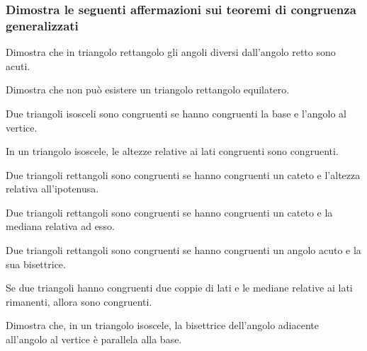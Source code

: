 \subsubsection*{Dimostra le seguenti affermazioni sui teoremi di 
congruenza generalizzati}
\begin{multicols}{2}

\begin{esercizio}
\label{ese:3.53}
Dimostra che in triangolo rettangolo gli angoli diversi dall'angolo 
retto sono acuti.
\end{esercizio}

\begin{esercizio}
\label{ese:3.54}
Dimostra che non può esistere un triangolo rettangolo equilatero.
\end{esercizio}

\begin{esercizio}
\label{ese:3.55}
Due triangoli isosceli sono congruenti se hanno congruenti la base e 
l'angolo al vertice.
\end{esercizio}

\begin{esercizio}
\label{ese:3.56}
In un triangolo isoscele, le altezze relative ai lati congruenti sono 
congruenti. 
\end{esercizio}

\begin{esercizio}
\label{ese:3.57}
Due triangoli rettangoli sono congruenti se hanno congruenti un 
cateto e l'altezza relativa all'ipotenusa.
\end{esercizio}

\begin{esercizio}
\label{ese:3.58}
Due triangoli rettangoli sono congruenti se hanno congruenti un 
cateto e la mediana relativa ad esso.
\end{esercizio}

\begin{esercizio}
\label{ese:3.59}
Due triangoli rettangoli sono congruenti se hanno congruenti un 
angolo acuto e la sua bisettrice.
\end{esercizio}

\begin{esercizio}
\label{ese:3.60}
Se due triangoli hanno congruenti due coppie di lati e le mediane 
relative ai lati rimanenti, allora sono congruenti.
\end{esercizio}

\begin{esercizio}
\label{ese:3.61}
Dimostra che, in un triangolo isoscele, la bisettrice dell'angolo 
adiacente all'angolo al vertice è parallela alla base.
\end{esercizio}


\end{multicols}
